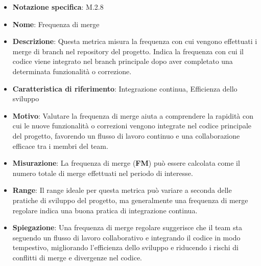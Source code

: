 \begin{itemize}
    \item \textbf{Notazione specifica}: M.2.8
    \item \textbf{Nome}: Frequenza di merge
    \item \textbf{Descrizione}: Questa metrica misura la frequenza con cui vengono effettuati i merge di branch nel repository del progetto. Indica la frequenza con cui il codice viene integrato nel branch principale dopo aver completato una determinata funzionalità o correzione.
    \item \textbf{Caratteristica di riferimento}: Integrazione continua, Efficienza dello sviluppo
    \item \textbf{Motivo}: Valutare la frequenza di merge aiuta a comprendere la rapidità con cui le nuove funzionalità o correzioni vengono integrate nel codice principale del progetto, favorendo un flusso di lavoro continuo e una collaborazione efficace tra i membri del team.
    \item \textbf{Misurazione}: La frequenza di merge (\textbf{FM}) può essere calcolata come il numero totale di merge effettuati nel periodo di interesse.
    \item \textbf{Range}: Il range ideale per questa metrica può variare a seconda delle pratiche di sviluppo del progetto, ma generalmente una frequenza di merge regolare indica una buona pratica di integrazione continua.
    \item \textbf{Spiegazione}: Una frequenza di merge regolare suggerisce che il team sta seguendo un flusso di lavoro collaborativo e integrando il codice in modo tempestivo, migliorando l'efficienza dello sviluppo e riducendo i rischi di conflitti di merge e divergenze nel codice.
\end{itemize}
